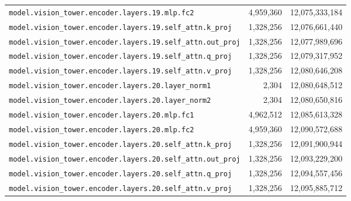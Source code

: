 \documentclass[10pt,a4paper]{article}
\theoremstyle{definition}
\begin{document}
\begin{appendices}
\begin{longtable}{p{9.5cm}rr}
\texttt{model.\allowbreak{}vision\_tower.\allowbreak{}encoder.\allowbreak{}layers.\allowbreak{}19.\allowbreak{}mlp.\allowbreak{}fc2} & 4,959,360 & 12,075,333,184 \\
\texttt{model.\allowbreak{}vision\_tower.\allowbreak{}encoder.\allowbreak{}layers.\allowbreak{}19.\allowbreak{}self\_attn.\allowbreak{}k\_proj} & 1,328,256 & 12,076,661,440 \\
\texttt{model.\allowbreak{}vision\_tower.\allowbreak{}encoder.\allowbreak{}layers.\allowbreak{}19.\allowbreak{}self\_attn.\allowbreak{}out\_proj} & 1,328,256 & 12,077,989,696 \\
\texttt{model.\allowbreak{}vision\_tower.\allowbreak{}encoder.\allowbreak{}layers.\allowbreak{}19.\allowbreak{}self\_attn.\allowbreak{}q\_proj} & 1,328,256 & 12,079,317,952 \\
\texttt{model.\allowbreak{}vision\_tower.\allowbreak{}encoder.\allowbreak{}layers.\allowbreak{}19.\allowbreak{}self\_attn.\allowbreak{}v\_proj} & 1,328,256 & 12,080,646,208 \\
\texttt{model.\allowbreak{}vision\_tower.\allowbreak{}encoder.\allowbreak{}layers.\allowbreak{}20.\allowbreak{}layer\_norm1} & 2,304 & 12,080,648,512 \\
\texttt{model.\allowbreak{}vision\_tower.\allowbreak{}encoder.\allowbreak{}layers.\allowbreak{}20.\allowbreak{}layer\_norm2} & 2,304 & 12,080,650,816 \\
\texttt{model.\allowbreak{}vision\_tower.\allowbreak{}encoder.\allowbreak{}layers.\allowbreak{}20.\allowbreak{}mlp.\allowbreak{}fc1} & 4,962,512 & 12,085,613,328 \\
\texttt{model.\allowbreak{}vision\_tower.\allowbreak{}encoder.\allowbreak{}layers.\allowbreak{}20.\allowbreak{}mlp.\allowbreak{}fc2} & 4,959,360 & 12,090,572,688 \\
\texttt{model.\allowbreak{}vision\_tower.\allowbreak{}encoder.\allowbreak{}layers.\allowbreak{}20.\allowbreak{}self\_attn.\allowbreak{}k\_proj} & 1,328,256 & 12,091,900,944 \\
\texttt{model.\allowbreak{}vision\_tower.\allowbreak{}encoder.\allowbreak{}layers.\allowbreak{}20.\allowbreak{}self\_attn.\allowbreak{}out\_proj} & 1,328,256 & 12,093,229,200 \\
\texttt{model.\allowbreak{}vision\_tower.\allowbreak{}encoder.\allowbreak{}layers.\allowbreak{}20.\allowbreak{}self\_attn.\allowbreak{}q\_proj} & 1,328,256 & 12,094,557,456 \\
\texttt{model.\allowbreak{}vision\_tower.\allowbreak{}encoder.\allowbreak{}layers.\allowbreak{}20.\allowbreak{}self\_attn.\allowbreak{}v\_proj} & 1,328,256 & 12,095,885,712 \\

\end{longtable}
\end{appendices}
\end{document}
